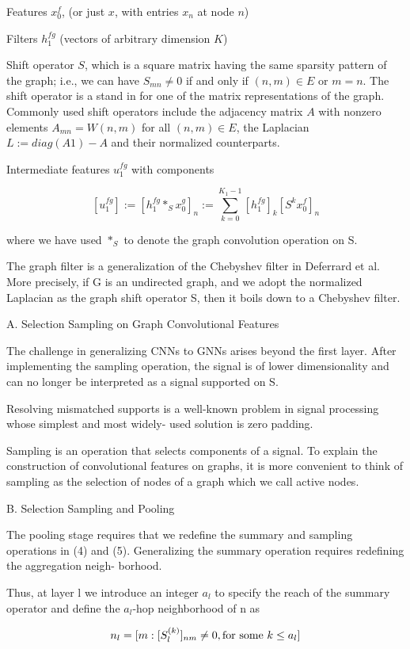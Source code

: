 \documentclass[english]{article}
\begin{document}
Features $x_0^f$, (or just $x$, with entries $x_n$ at node $n$)

Filters $h_1^{fg}$ (vectors of arbitrary dimension $K$) 

Shift
operator $S$, which is a square matrix having the same
sparsity pattern of the graph; i.e., we can have $S_{mn}\neq 0$ if
and only if $(n,m) \in E$ or $m = n$. The shift operator is a
stand in for one of the matrix representations of the graph.
Commonly used shift operators include the adjacency matrix
$A$ with nonzero elements $A_{mn} = W(n,m)$ for all $(n,m) \in
E$, the Laplacian $L := diag(A1) - A$ and their normalized
counterparts.


Intermediate features $u_1^{fg}$ with components

$$
[u_1^{fg}]
:=
[h_1^{fg}*_Sx_0^g]_n
:=
\sum_{k=0}^{K_1-1}
[h_1^{fg}]_k[S^kx_0^f]_n
$$

where we have used $*_S$ to denote the graph convolution
operation on S.

The graph filter is a generalization of the Chebyshev filter
in Deferrard et al. More precisely, if G is an undirected graph, and we
adopt the normalized Laplacian as the graph shift operator S,
then it boils down to a Chebyshev filter.

A. Selection Sampling on Graph Convolutional Features

The challenge in generalizing CNNs to GNNs arises beyond
the first layer. After implementing the sampling operation, the signal is of lower dimensionality  and
can no longer be interpreted as a signal supported on S.

 Resolving mismatched supports is a well-known
problem in signal processing whose simplest and most widely-
used solution is zero padding. 

Sampling is an operation that selects components of a
signal. To explain the construction of convolutional features
on graphs, it is more convenient to think of sampling as the
selection of nodes of a graph which we call active nodes.

B. Selection Sampling and Pooling

The pooling stage requires that we redefine the summary
and sampling operations in (4) and (5). Generalizing the
summary operation requires redefining the aggregation neigh-
borhood.

Thus, at layer l we introduce an integer $a_l$ to specify the reach of the summary operator and define the $a_l$-hop neighborhood of
n as

$$n_l =
[m: [S^{(k)}_l]_{nm}
\neq 0, \textnormal{for some } 
k \leq a_l]
$$
\end{document}
